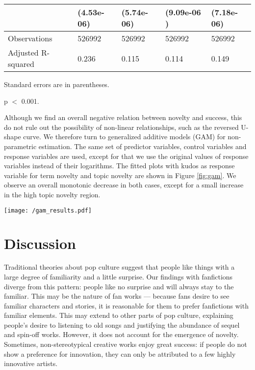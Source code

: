 \documentclass[letterpaper]{article} %
\begin{document}
\begin{table*}
\begin{tabular}[width=0.8\textwidth]{p{4cm}p{3cm}p{3cm}p{3cm}p{3cm}}
& (4.53e-06) & (5.74e-06) & (9.09e-06 ) & (7.18e-06)\\
\hline 
Observations & 526992 & 526992 & 526992 & 526992 \\
Adjusted R-squared & 0.236 & 0.115 & 0.114  & 0.149\\
\bottomrule
\end{tabular}
 \begin{tablenotes}
      \small
      \item Standard errors are in parentheses.
      \item *p $<$ 0.001.
       \end{tablenotes}
\caption{OLS results}
\label{tab:regression}
\end{table*}%

Although we find an overall negative relation between novelty and success, this do not rule out the possibility of non-linear relationships, such as the reversed U-shape curve. We therefore turn to generalized additive models (GAM) \cite{wood2006generalized} for non-parametric estimation. The same set of predictor variables, control variables and response variables are used, except for that we use the original values of response variables instead of their logarithms. The fitted plots with kudos as response variable for term novelty and topic novelty are shown in Figure \ref{fig:gam}. We observe an overall monotonic decrease in both cases, except for a small increase in the high topic novelty region.

\begin{figure*}
    \centering
          \texttt{[image: /gam\_results.pdf]}
        \caption{Fit plots of the generalized additive models.}
        \label{fig:gam}
\end{figure*}

\section*{Discussion}
Traditional theories about pop culture suggest that people like things with a large degree of familiarity and a little surprise. Our findings with fanfictions diverge from this pattern: people like no surprise and will always stay to the familiar. This may be the nature of fan works --- because fans desire to see familiar characters and stories, it is reasonable for them to prefer fanfictions with familiar elements. This may extend to other parts of pop culture, explaining people's desire to listening to old songs and justifying the abundance of sequel and spin-off works. However, it does not account for the emergence of novelty. Sometimes, non-stereotypical creative works enjoy great success: if people do not show a preference for innovation, they can only be attributed to a few highly innovative artists.
\end{document}

